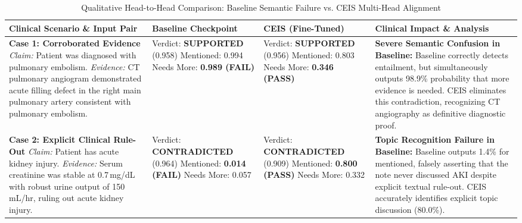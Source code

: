 \documentclass[10pt,conference]{IEEEtran}
\begin{document}
\begin{table}[t]
\centering
\caption{Qualitative Head-to-Head Comparison: Baseline Semantic Failure vs. CEIS Multi-Head Alignment}
\label{tab:head_to_head}
\begin{tabular}{@{}p{3.8cm}p{3.2cm}p{3.2cm}p{6.4cm}@{}}
\toprule
\textbf{Clinical Scenario \& Input Pair} & \textbf{Baseline Checkpoint} & \textbf{CEIS (Fine-Tuned)} & \textbf{Clinical Impact \& Analysis} \\
\midrule
\textbf{Case 1: Corroborated Evidence}\newline
\textit{Claim:} Patient was diagnosed with pulmonary embolism.\newline
\textit{Evidence:} CT pulmonary angiogram demonstrated acute filling defect in the right main pulmonary artery consistent with pulmonary embolism. &
Verdict: \textbf{SUPPORTED} (0.958)\newline
Mentioned: 0.994\newline
Needs More: \textbf{0.989 (FAIL)} &
Verdict: \textbf{SUPPORTED} (0.956)\newline
Mentioned: 0.803\newline
Needs More: \textbf{0.346 (PASS)} &
\textbf{Severe Semantic Confusion in Baseline:} Baseline correctly detects entailment, but simultaneously outputs 98.9\% probability that more evidence is needed. CEIS eliminates this contradiction, recognizing CT angiography as definitive diagnostic proof. \\
\midrule
\textbf{Case 2: Explicit Clinical Rule-Out}\newline
\textit{Claim:} Patient has acute kidney injury.\newline
\textit{Evidence:} Serum creatinine was stable at 0.7\,mg/dL with robust urine output of 150\,mL/hr, ruling out acute kidney injury. &
Verdict: \textbf{CONTRADICTED} (0.964)\newline
Mentioned: \textbf{0.014 (FAIL)}\newline
Needs More: 0.057 &
Verdict: \textbf{CONTRADICTED} (0.909)\newline
Mentioned: \textbf{0.800 (PASS)}\newline
Needs More: 0.332 &
\textbf{Topic Recognition Failure in Baseline:} Baseline outputs 1.4\% for mentioned, falsely asserting that the note never discussed AKI despite explicit textual rule-out. CEIS accurately identifies explicit topic discussion (80.0\%). \\
\bottomrule
\end{tabular}
\end{table}
\end{document}
